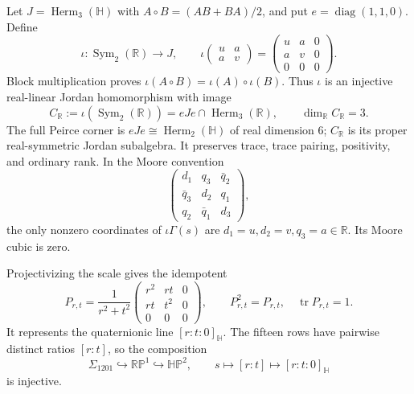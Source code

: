 Let $J=\operatorname{Herm}_3(\mathbb H)$ with
$A\circ B=(AB+BA)/2$, and put $e=\operatorname{diag}(1,1,0)$.  Define
\begin{equation}
 \iota:\operatorname{Sym}_2(\mathbb R)\longrightarrow J,
 \qquad
 \iota\begin{pmatrix}u&a\\a&v\end{pmatrix}
 =\begin{pmatrix}u&a&0\\a&v&0\\0&0&0\end{pmatrix}.
 \label{eq:fifteen-iota}
\end{equation}
Block multiplication proves
$\iota(A\circ B)=\iota(A)\circ\iota(B)$.  Thus $\iota$ is an injective
real-linear Jordan homomorphism with image
\[
 C_{\mathbb R}:=\iota(\operatorname{Sym}_2(\mathbb R))
 =eJe\cap\operatorname{Herm}_3(\mathbb R),
 \qquad \dim_{\mathbb R}C_{\mathbb R}=3.
\]
The full Peirce corner is
$eJe\cong\operatorname{Herm}_2(\mathbb H)$ of real dimension $6$;
$C_{\mathbb R}$ is its proper real-symmetric Jordan subalgebra.
It preserves trace, trace pairing, positivity, and ordinary rank.  In the
Moore convention
\[
 \begin{pmatrix}d_1&q_3&\bar q_2\\
 \bar q_3&d_2&q_1\\q_2&\bar q_1&d_3\end{pmatrix},
\]
the only nonzero coordinates of $\iota\Gamma(s)$ are
$d_1=u,d_2=v,q_3=a\in\mathbb R$.  Its Moore cubic is zero.

Projectivizing the scale gives the idempotent
\begin{equation}
 P_{r,t}=\frac1{r^2+t^2}
 \begin{pmatrix}r^2&rt&0\\rt&t^2&0\\0&0&0\end{pmatrix},
 \qquad P_{r,t}^2=P_{r,t},\quad\operatorname{tr}P_{r,t}=1.
 \label{eq:fifteen-projector}
\end{equation}
It represents the quaternionic line $[r:t:0]_{\mathbb H}$.  The fifteen
rows have pairwise distinct ratios $[r:t]$, so the composition
\begin{equation}
 \Sigma_{1201}\hookrightarrow\mathbb{RP}^1\hookrightarrow\mathbb{HP}^2,
 \qquad s\longmapsto[r:t]\longmapsto[r:t:0]_{\mathbb H}
 \label{eq:fifteen-RP1-HP2}
\end{equation}
is injective.

